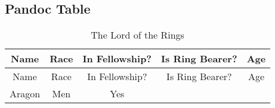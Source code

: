 \documentclass[
]{article}
\begin{document}
\hypertarget{pandoc-table}{%
\subsection{Pandoc Table}\label{pandoc-table}}

\begin{longtable}[]{@{}ccccc@{}}
\caption{The Lord of the Rings}\tabularnewline
\toprule
\begin{minipage}[b]{0.11\columnwidth}\centering
Name\strut
\end{minipage} & \begin{minipage}[b]{0.11\columnwidth}\centering
Race\strut
\end{minipage} & \begin{minipage}[b]{0.20\columnwidth}\centering
In Fellowship?\strut
\end{minipage} & \begin{minipage}[b]{0.21\columnwidth}\centering
Is Ring Bearer?\strut
\end{minipage} & \begin{minipage}[b]{0.08\columnwidth}\centering
Age\strut
\end{minipage}\tabularnewline
\midrule
\endfirsthead
\toprule
\begin{minipage}[b]{0.11\columnwidth}\centering
Name\strut
\end{minipage} & \begin{minipage}[b]{0.11\columnwidth}\centering
Race\strut
\end{minipage} & \begin{minipage}[b]{0.20\columnwidth}\centering
In Fellowship?\strut
\end{minipage} & \begin{minipage}[b]{0.21\columnwidth}\centering
Is Ring Bearer?\strut
\end{minipage} & \begin{minipage}[b]{0.08\columnwidth}\centering
Age\strut
\end{minipage}\tabularnewline
\midrule
\endhead
\begin{minipage}[t]{0.11\columnwidth}\centering
Aragon\strut
\end{minipage} & \begin{minipage}[t]{0.11\columnwidth}\centering
Men\strut
\end{minipage} & \begin{minipage}[t]{0.20\columnwidth}\centering
Yes\strut
\end{minipage} & \begin{minipage}[t]{0.21\columnwidth}\centering

\end{minipage}
\end{longtable}
\end{document}
